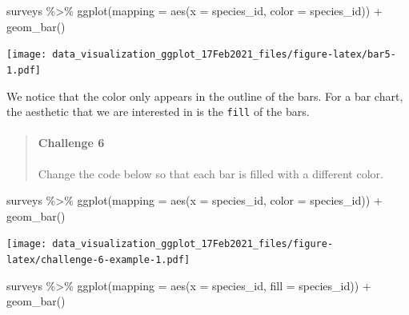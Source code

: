 \documentclass[
]{article}
\newenvironment{Shaded}{\begin{snugshade}}{\end{snugshade}}
\newcommand{\AttributeTok}[1]{\textcolor[rgb]{0.77,0.63,0.00}{#1}}
\newcommand{\FunctionTok}[1]{\textcolor[rgb]{0.00,0.00,0.00}{#1}}
\newcommand{\NormalTok}[1]{#1}
\newcommand{\SpecialCharTok}[1]{\textcolor[rgb]{0.00,0.00,0.00}{#1}}
\begin{document}
\begin{Shaded}
\begin{Highlighting}[]
\NormalTok{surveys }\SpecialCharTok{\%\textgreater{}\%} 
  \FunctionTok{ggplot}\NormalTok{(}\AttributeTok{mapping =} \FunctionTok{aes}\NormalTok{(}\AttributeTok{x =}\NormalTok{ species\_id, }\AttributeTok{color =}\NormalTok{ species\_id)) }\SpecialCharTok{+} 
  \FunctionTok{geom\_bar}\NormalTok{()}
\end{Highlighting}
\end{Shaded}

\texttt{[image: data\_visualization\_ggplot\_17Feb2021\_files/figure-latex/bar5-1.pdf]}

We notice that the color only appears in the outline of the bars. For a
bar chart, the aesthetic that we are interested in is the \texttt{fill}
of the bars.

\begin{quote}
\mbox{}%
\hypertarget{challenge-6}{%
\paragraph{Challenge 6}\label{challenge-6}}

Change the code below so that each bar is filled with a different color.
\end{quote}

\begin{Shaded}
\begin{Highlighting}[]
\NormalTok{surveys }\SpecialCharTok{\%\textgreater{}\%} 
  \FunctionTok{ggplot}\NormalTok{(}\AttributeTok{mapping =} \FunctionTok{aes}\NormalTok{(}\AttributeTok{x =}\NormalTok{ species\_id, }\AttributeTok{color =}\NormalTok{ species\_id)) }\SpecialCharTok{+} 
  \FunctionTok{geom\_bar}\NormalTok{()}
\end{Highlighting}
\end{Shaded}

\texttt{[image: data\_visualization\_ggplot\_17Feb2021\_files/figure-latex/challenge-6-example-1.pdf]}

\begin{Shaded}
\begin{Highlighting}[]
\NormalTok{surveys }\SpecialCharTok{\%\textgreater{}\%} 
  \FunctionTok{ggplot}\NormalTok{(}\AttributeTok{mapping =} \FunctionTok{aes}\NormalTok{(}\AttributeTok{x =}\NormalTok{ species\_id, }\AttributeTok{fill =}\NormalTok{ species\_id)) }\SpecialCharTok{+} 
  \FunctionTok{geom\_bar}\NormalTok{()}
\end{Highlighting}
\end{Shaded}
\end{document}
